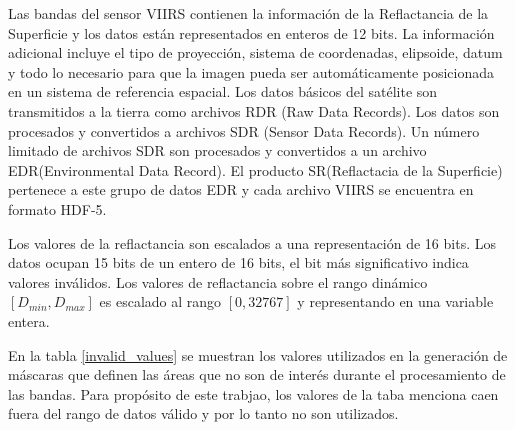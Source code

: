 Las bandas del sensor VIIRS contienen la información de la Reflactancia de la Superficie y los datos están representados en enteros de 12 bits. La información adicional incluye el tipo de proyección, sistema de coordenadas, elipsoide, datum y todo lo necesario para que la imagen pueda ser automáticamente posicionada en un sistema de referencia espacial. Los datos básicos del satélite son transmitidos a la tierra como archivos RDR (Raw Data Records). Los datos son procesados y convertidos a archivos SDR (Sensor Data Records). Un número limitado de archivos SDR son procesados y convertidos a un archivo EDR(Environmental Data Record). El producto SR(Reflactacia de la Superficie) pertenece a este grupo de datos EDR y cada archivo VIIRS se encuentra en formato HDF-5. 

Los valores de la reflactancia son escalados a una representación de 16 bits. Los datos ocupan 15 bits de un entero de 16 bits, el bit más significativo indica valores inválidos. Los valores de reflactancia sobre el rango dinámico $[D_{min}, D_{max}]$ es escalado al rango $[0, 32767]$ y representando en una variable entera. 

En la tabla \ref{invalid_values} se muestran los valores utilizados en la generación de máscaras que definen las áreas que no son de interés durante el procesamiento de las bandas. Para propósito de este trabjao, los valores de la taba menciona caen fuera del rango de datos válido y por lo tanto no son utilizados.  

